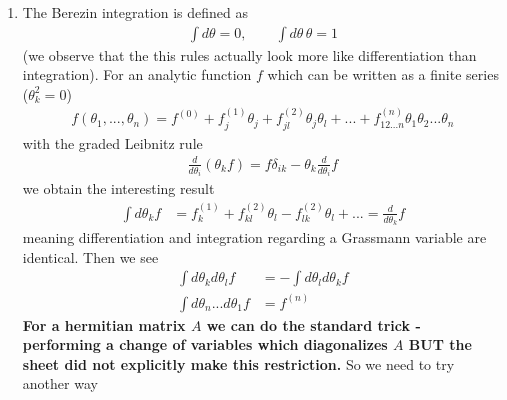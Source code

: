 \documentclass[10pt,a4paper]{article}
\theoremstyle{definition}
\begin{document}
\begin{enumerate}
\begin{itemize}
\begin{align}
&=(\beta_1+i\beta_2)^*(\alpha_1+i\alpha_2)^*\\
&=\beta^*\alpha^*
\end{align}
as well as (the anticommuting goes through the (linear) sum)
\begin{align}
\langle\alpha,\beta\rangle&=\alpha^{*k}\beta_k\\
&=((\alpha^{*k}\beta_k)^*)^*\\
&=(\beta^{*k}\alpha_{k})^*\\
&=\langle\beta,\alpha\rangle^*
\end{align}
then using this results in $\langle A\theta,\theta\rangle=\langle\theta,A\theta\rangle=\langle A\theta,\theta\rangle^*$  implies $\langle\theta,A\theta\rangle$ is real.

It is also bosonic (commutes with other Grassmann variables) - because 
\end{itemize}

\item The Berezin integration is defined as
\begin{align}
\int d\theta=0,\qquad\int d\theta\,\theta=1
\end{align} 
(we observe that the this rules actually look more like differentiation than integration).
For an analytic function $f$ which can be written as a finite series ($\theta_k^2=0$)
\begin{align}
f(\theta_1,...,\theta_n)=f^{(0)}+f_j^{(1)}\theta_j+f_{jl}^{(2)}\theta_j\theta_l+...+f^{(n)}_{12...n}\theta_1\theta_2...\theta_n
\end{align}
with the graded Leibnitz rule
\begin{align}
\frac{d}{d\theta_i}(\theta_kf)=f\delta_{ik}-\theta_k\frac{d}{d\theta_i}f
\end{align}
we obtain the interesting result
\begin{align}
\int d\theta_k f
&=f_k^{(1)}+f_{kl}^{(2)}\theta_l-f_{lk}^{(2)}\theta_l+...=\frac{d}{d\theta_k}f
\end{align} 
meaning differentiation and integration regarding a Grassmann variable are identical. Then we see
\begin{align}
\int d\theta_kd\theta_l f&=-\int d\theta_ld\theta_k f\\
\int d\theta_n...d\theta_1 f&=f^{(n)}
\end{align}
{\bf For a hermitian matrix $A$ we can do the standard trick - performing a change of variables which diagonalizes $A$ BUT the sheet did not explicitly make this restriction.} So we need to try another way


\end{enumerate}
\end{document}

